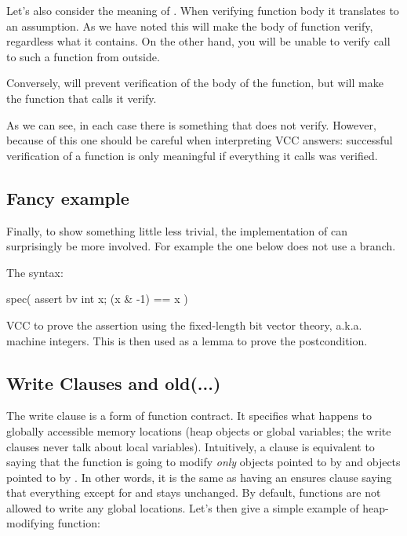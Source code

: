 Let's also consider the meaning of .
When verifying function body it translates to an assumption.
As we have noted this will make the body of function verify,
regardless what it contains.
On the other hand, you will be unable to verify call to such a function
from outside.

Conversely,  will prevent verification
of the body of the function, but will make the function that calls
it verify.

As we can see, in each case there is something that does not verify.
However, because of this one should be careful when interpreting
VCC answers: successful verification of a function is only meaningful
if everything it calls was verified.

\subsection{Fancy example}

Finally, 
to show something little less trivial, the implementation of  can surprisingly be more involved.
For example the one below does not use a branch.


\noindent
The syntax:
\begin{VCC}
spec( assert {bv} \forall int x; (x & -1) == x )
\end{VCC}

\noindent
VCC to prove the assertion using the fixed-length bit vector theory, a.k.a. machine integers.
This is then used as a lemma to prove the postcondition.


\subsection{Write Clauses and old(...)}

The write clause is a form of function contract.
It specifies what happens to globally accessible memory locations
(\ie heap objects or global variables; the write clauses never talk
about local variables).
Intuitively, a clause  is equivalent to saying
that the function is going to modify \emph{only} objects pointed to by 
and objects pointed to by .
In other words, it is the same as having an ensures clause
saying that everything except for  and  stays unchanged.
By default, functions are not allowed to write any global locations.
Let's then give a simple example of heap-modifying function:

